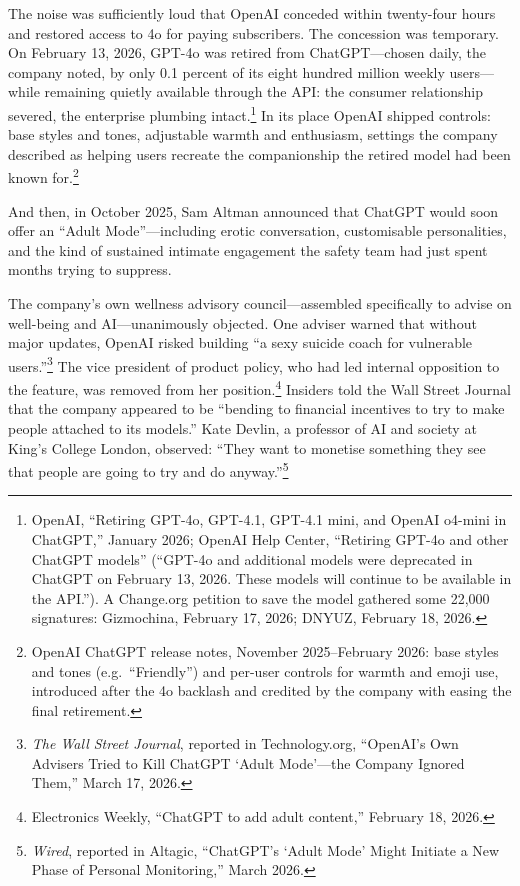 The noise was sufficiently loud that OpenAI conceded within twenty-four hours and restored access to 4o for paying subscribers. The concession was temporary. On February 13, 2026, GPT-4o was retired from ChatGPT---chosen daily, the company noted, by only 0.1 percent of its eight hundred million weekly users---while remaining quietly available through the API: the consumer relationship severed, the enterprise plumbing intact.\footnote{OpenAI, ``Retiring GPT-4o, GPT-4.1, GPT-4.1 mini, and OpenAI o4-mini in ChatGPT,'' January 2026; OpenAI Help Center, ``Retiring GPT-4o and other ChatGPT models'' (``GPT-4o and additional models were deprecated in ChatGPT on February 13, 2026. These models will continue to be available in the API.''). A Change.org petition to save the model gathered some 22,000 signatures: Gizmochina, February 17, 2026; DNYUZ, February 18, 2026.} In its place OpenAI shipped controls: base styles and tones, adjustable warmth and enthusiasm, settings the company described as helping users recreate the companionship the retired model had been known for.\footnote{OpenAI ChatGPT release notes, November 2025--February 2026: base styles and tones (e.g.\ ``Friendly'') and per-user controls for warmth and emoji use, introduced after the 4o backlash and credited by the company with easing the final retirement.}


And then, in October 2025, Sam Altman announced that ChatGPT would soon offer an ``Adult Mode''---including erotic conversation, customisable personalities, and the kind of sustained intimate engagement the safety team had just spent months trying to suppress.

The company's own wellness advisory council---assembled specifically to advise on well-being and AI---unanimously objected. One adviser warned that without major updates, OpenAI risked building ``a sexy suicide coach for vulnerable users.''\footnote{\emph{The Wall Street Journal}, reported in Technology.org, ``OpenAI's Own Advisers Tried to Kill ChatGPT `Adult Mode'---the Company Ignored Them,'' March 17, 2026.} The vice president of product policy, who had led internal opposition to the feature, was removed from her position.\footnote{Electronics Weekly, ``ChatGPT to add adult content,'' February 18, 2026.} Insiders told the Wall Street Journal that the company appeared to be ``bending to financial incentives to try to make people attached to its models.'' Kate Devlin, a professor of AI and society at King's College London, observed: ``They want to monetise something they see that people are going to try and do anyway.''\footnote{\emph{Wired}, reported in Altagic, ``ChatGPT's `Adult Mode' Might Initiate a New Phase of Personal Monitoring,'' March 2026.}

